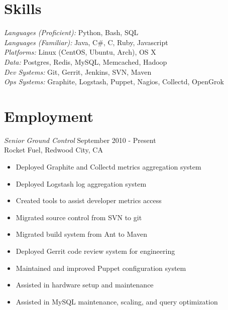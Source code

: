 \documentclass[line,margin]{res}
\begin{document}
\address{\sl resume@corryh.com}
\address{\sl github.com/tabletcorry}

\begin{resume}
 
\section{Skills} {\sl Languages (Proficient):} Python, Bash, SQL\\
                {\sl Languages (Familiar):} Java, C\#, C, Ruby, Javascript\\
                {\sl Platforms:} Linux (CentOS, Ubuntu, Arch), OS X\\
                {\sl Data:} Postgres, Redis, MySQL, Memcached, Hadoop\\
                {\sl Dev Systems:} Git, Gerrit, Jenkins, SVN, Maven\\
                {\sl Ops Systems:} Graphite, Logstash, Puppet, Nagios, Collectd, OpenGrok
 
\section{Employment} 
                {\sl Senior Ground Control} \hfill September 2010 - Present \\
                Rocket Fuel, Redwood City, CA
                \begin{itemize}  \itemsep -2pt
                 \item Deployed Graphite and Collectd metrics aggregation system
                 \item Deployed Logstash log aggregation system
                 \item Created tools to assist developer metrics access
                 \item Migrated source control from SVN to git
                 \item Migrated build system from Ant to Maven
                 \item Deployed Gerrit code review system for engineering
                 \item Maintained and improved Puppet configuration system
                 \item Assisted in hardware setup and maintenance
                 \item Assisted in MySQL maintenance, scaling, and query optimization
                \end{itemize}


\end{resume}
\end{document}
